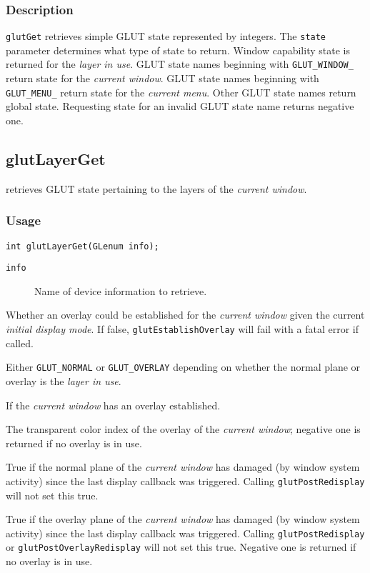 \subsubsection*{Description}

{\tt glutGet} retrieves simple GLUT state represented by integers.
The {\tt state} parameter determines what type of state to
return.  Window capability state is returned for the {\em layer in use}.
GLUT state names beginning with {\tt GLUT\_WINDOW\_}
return state for the {\em current window}.  GLUT state names beginning
with {\tt GLUT\_MENU\_} return state for the {\em current menu}.
Other GLUT state names return global state.
Requesting state for an invalid GLUT state name returns negative one.

\subsection{glutLayerGet}

 retrieves GLUT state pertaining to the layers of the
{\em current window}.

\subsubsection*{Usage}
\begin{verbatim}
int glutLayerGet(GLenum info);
\end{verbatim}
\begin{description}
\item[{\tt info}]  Name of device information to retrieve.
\itemsep 0in
\end{description}

\begin{description}
\itemsep 0in
\item[{\tt GLUT\_OVERLAY\_POSSIBLE}]
Whether an overlay could be established for the {\em current window} given the
current {\em initial display mode}.  If false, {\tt glutEstablishOverlay}
will fail with a fatal error if called.
\item[{\tt GLUT\_LAYER\_IN\_USE}]
Either {\tt GLUT\_NORMAL} or {\tt GLUT\_OVERLAY} depending on whether the normal
plane or overlay is the {\em layer in use}.
\item[{\tt GLUT\_HAS\_OVERLAY}]
If the {\em current window} has an overlay established.
\item[{\tt GLUT\_TRANSPARENT\_INDEX}]
The transparent color index of the overlay of the {\em current window}; negative
one is returned if no overlay is in use.
\item[{\tt GLUT\_NORMAL\_DAMAGED}]
True if the normal plane of the {\em current window} has damaged (by window system
activity) since the last display callback was triggered.  
Calling {\tt glutPostRedisplay}
will not set this true.
\item[{\tt GLUT\_OVERLAY\_DAMAGED}]
True if the overlay plane of the {\em current window} has damaged (by window system
activity) since the last display callback was triggered.
Calling {\tt glutPostRedisplay} or {\tt glutPostOverlayRedisplay}
will not set this true.  Negative one is returned if no overlay is in use.
\end{description}

